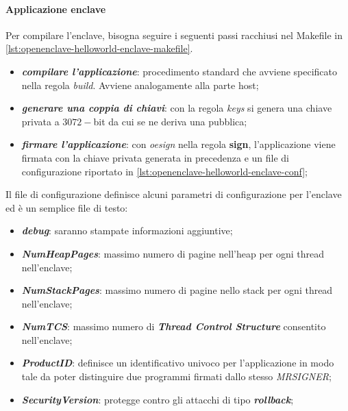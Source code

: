 \documentclass{article}
\begin{document}
\paragraph{Applicazione enclave}
Per compilare l'enclave, bisogna seguire i seguenti passi racchiusi nel Makefile in \cref{lst:openenclave-helloworld-enclave-makefile}.
\begin{itemize}
  \item \textbf{\textit{compilare l'applicazione}}: procedimento standard che avviene specificato nella regola \textit{build}. Avviene analogamente alla parte host;
  \item \textbf{\textit{generare una coppia di chiavi}}: con la regola \textit{keys} si genera una chiave privata a $3072-$bit da cui se ne deriva una pubblica;
  \item \textbf{\textit{firmare l'applicazione}}: con \textit{oesign} nella regola \textbf{sign}, l'applicazione viene firmata con la chiave privata generata in precedenza e un file di configurazione riportato in \cref{lst:openenclave-helloworld-enclave-conf};
\end{itemize}

Il file di configurazione definisce alcuni parametri di configurazione per l'enclave ed è un semplice file di testo:
\begin{itemize}
  \item \textbf{\textit{debug}}: saranno stampate informazioni aggiuntive;
  \item \textbf{\textit{NumHeapPages}}: massimo numero di pagine nell'heap per ogni thread nell'enclave;
  \item \textbf{\textit{NumStackPages}}: massimo numero di pagine nello stack per ogni thread nell'enclave;
  \item \textbf{\textit{NumTCS}}: massimo numero di \textbf{\textit{Thread Control Structure}} consentito nell'enclave;
  \item \textbf{\textit{ProductID}}: definisce un identificativo univoco per l'applicazione in modo tale da poter distinguire due programmi firmati dallo stesso \textit{MRSIGNER};
  \item \textbf{\textit{SecurityVersion}}: protegge contro gli attacchi di tipo \textbf{\textit{rollback}};
\end{itemize}


\end{document}

